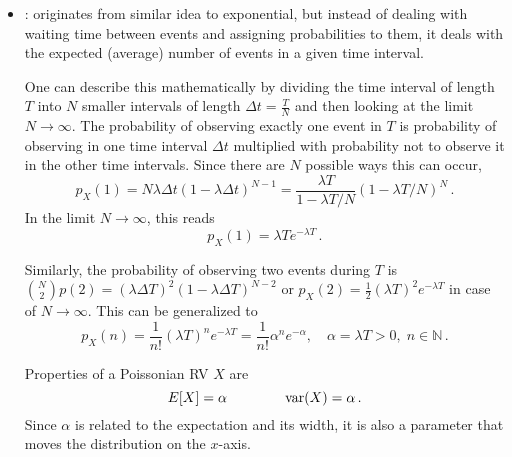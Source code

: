 \begin{ex}
\begin{itemize}


\item {}: originates from similar idea to exponential, but instead of dealing with waiting time between events and assigning probabilities to them, it deals with the expected (average) number of events in a given time interval.

One can describe this mathematically by dividing the time interval of length $T$ into $N$ smaller intervals of length $\Delta t = \frac{T}{N}$ and then looking at the limit $N \rightarrow \infty$. The probability of observing exactly one event in $T$ is probability of observing in one time interval $\Delta t$ multiplied with probability not to observe it in the other time intervals. Since there are $N$ possible ways this can occur,
\begin{equation*}
p_X(1) = N \lambda \Delta t (1 - \lambda \Delta t)^{N - 1} = \frac{\lambda T}{1 - \lambda T/ N} (1 - \lambda T/ N)^N \, .
\end{equation*}
In the limit $N \rightarrow \infty$, this reads
\begin{equation*}
p_X(1) = \lambda T e^{- \lambda T} \, .
\end{equation*}

Similarly, the probability of observing two events during $T$ is $\binom{N}{2} p(2) = (\lambda \Delta T)^2 (1 - \lambda \Delta T)^{N - 2}$ or $p_X(2) = \frac{1}{2} (\lambda T)^2 e^{- \lambda T}$ in case of $N \rightarrow \infty$. This can be generalized to
\begin{equation}
p_X(n) = \frac{1}{n!} (\lambda T)^n e^{- \lambda T} = \frac{1}{n!} \alpha^n e^{- \alpha}, \quad \alpha = \lambda T > 0, \; n \in \mathbb{N} \, .
\end{equation}



Properties of a Poissonian RV $X$ are
\begin{equation}
E[X] = \alpha \qquad \qquad \operatorname{var}(X) = \alpha \, .
\end{equation}
Since $\alpha$ is related to the expectation and its width, it is also a parameter that moves the distribution on the $x$-axis.%



\end{itemize}
\end{ex}
